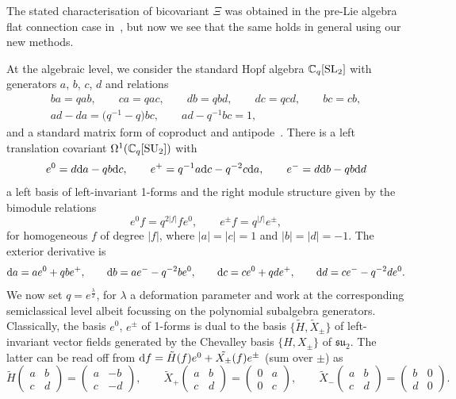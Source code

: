 \documentclass[pdftex]{sigma}
\numberwithin{equation}{section}
\newcommand{\<}{{\langle}}
\renewcommand{\>}{{\rangle}}
\newcommand{\extd}{{\rm d}}
\begin{document}
The stated characterisation of bicovariant $\Xi$ was obtained in the pre-Lie algebra flat connection case in~\cite{MaTao:plg}, but now we see that the same holds in general using our new methods.

\begin{Example}\label{exSU2} At the algebraic level, we consider the standard Hopf algebra $\mathbb{C}_q[{\rm SL}_2]$ with generators $a$, $b$, $c$, $d$ and relations
\begin{gather*} ba=qab, \qquad ca=qac, \qquad db=qbd, \qquad dc=qcd, \qquad bc=cb, \\
 ad-da=\big(q^{-1}-q\big)bc, \qquad ad-q^{-1}bc=1, \end{gather*} and a standard matrix form of coproduct and antipode~\cite{Ma:book}. There is a left translation covariant $\Omega^1(\mathbb{C}_q[{\rm SU}_2])$ with~\cite{Wor}
\[ e^0=d\extd a-qb\extd c,\qquad e^+=q^{-1}a\extd c-q^{-2}c\extd a,\qquad e^-=d\extd b-qb\extd d \]
a left basis of left-invariant 1-forms and the right module structure given by the bimodule relations
\[ e^0f=q^{2|f|}fe^0, \qquad e^{\pm}f=q^{|f|}e^{\pm},\]
for homogeneous $f$ of degree $|f|$, where $|a|=|c|=1$ and $|b|=|d|=-1$. The exterior derivative is
\[ \extd a=ae^0+qbe^+,\qquad \extd b=ae^--q^{-2}be^0,\qquad \extd c=ce^0+qde^+,\qquad \extd d=ce^--q^{-2}de^0.\]
We now set $q=e^{\frac{\lambda}{2}}$, for $\lambda$ a deformation parameter and work at the corresponding semiclassical level albeit focussing on the polynomial subalgebra generators. Classically, the basis $e^0$, $e^\pm$ of 1-forms is dual to the basis $\big\{\tilde H,\tilde X_\pm\big\}$ of left-invariant vector fields generated by the Chevalley basis $\lbrace H,X_{\pm}\rbrace$ of $\mathfrak{su}_2$. The latter can be read off from $\extd f=\tilde{H}(f)e^0+\tilde{X_\pm}(f)e^\pm$ (sum over $\pm$) as
\[ \tilde H\begin{pmatrix} a & b \\ c & d \end{pmatrix}=\begin{pmatrix} a & -b \\ c & -d \end{pmatrix},\qquad \tilde X_+\begin{pmatrix} a & b \\ c & d \end{pmatrix}=\begin{pmatrix} 0 & a \\ 0 & c \end{pmatrix},\qquad \tilde X_-\begin{pmatrix} a & b \\ c & d \end{pmatrix}=\begin{pmatrix} b & 0 \\ d & 0 \end{pmatrix}. \]

\end{Example}
\end{document}
